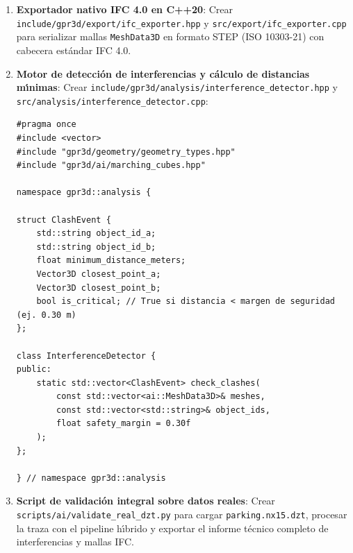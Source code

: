 \documentclass[11pt,a4paper]{article}
\begin{document}
\begin{enumerate}
    \item \textbf{Exportador nativo IFC 4.0 en C++20}:
    Crear \texttt{include/gpr3d/export/ifc\_exporter.hpp} y \texttt{src/export/ifc\_exporter.cpp} para serializar mallas \texttt{MeshData3D} en formato STEP (ISO 10303-21) con cabecera est{\'a}ndar IFC 4.0.

    \item \textbf{Motor de detecci{\'o}n de interferencias y c{\'a}lculo de distancias m{\'\i}nimas}:
    Crear \texttt{include/gpr3d/analysis/interference\_detector.hpp} y \texttt{src/analysis/interference\_detector.cpp}:
\begin{verbatim}
#pragma once
#include <vector>
#include "gpr3d/geometry/geometry_types.hpp"
#include "gpr3d/ai/marching_cubes.hpp"

namespace gpr3d::analysis {

struct ClashEvent {
    std::string object_id_a;
    std::string object_id_b;
    float minimum_distance_meters;
    Vector3D closest_point_a;
    Vector3D closest_point_b;
    bool is_critical; // True si distancia < margen de seguridad (ej. 0.30 m)
};

class InterferenceDetector {
public:
    static std::vector<ClashEvent> check_clashes(
        const std::vector<ai::MeshData3D>& meshes,
        const std::vector<std::string>& object_ids,
        float safety_margin = 0.30f
    );
};

} // namespace gpr3d::analysis
\end{verbatim}

    \item \textbf{Script de validaci{\'o}n integral sobre datos reales}:
    Crear \texttt{scripts/ai/validate\_real\_dzt.py} para cargar \texttt{parking.nx15.dzt}, procesar la traza con el pipeline h{\'\i}brido y exportar el informe t{\'e}cnico completo de interferencias y mallas IFC.
\end{enumerate}
\end{document}
